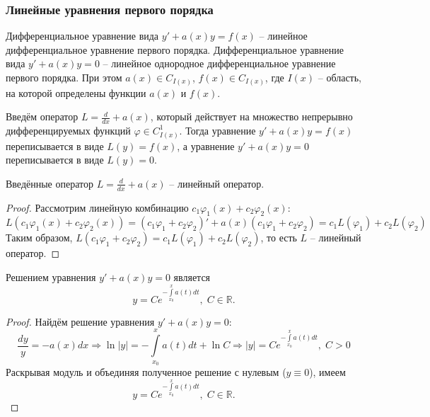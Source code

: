\subsubsection{Линейные уравнения первого порядка}

\begin{definition}
    Дифференциальное уравнение вида $y' + a(x) y = f(x)$ -- линейное дифференциальное уравнение первого порядка. Дифференциальное уравнение вида $y' + a(x) y = 0$ -- линейное однородное дифференциальное уравнение первого порядка. При этом $a(x) \in C_{I(x)}$, $f(x) \in C_{I(x)}$, где $I(x)$ -- область, на которой определены функции $a(x)$ и $f(x)$. 
\end{definition}

Введём оператор $L = \frac{d}{dx} + a(x)$, который действует на множество непрерывно дифференцируемых функций $\varphi \in C^1_{I(x)}$. Тогда уравнение $y' + a(x) y = f(x)$ переписывается в виде $L(y) = f(x)$, а уравнение $y' + a(x) y = 0$ переписывается в виде $L(y) = 0$.

\begin{theorem}
    Введённые оператор $L = \frac{d}{dx} + a(x)$ -- линейный оператор.
\end{theorem}

\begin{proof}
    Рассмотрим линейную комбинацию $c_1 \varphi_1(x) + c_2 \varphi_2(x)$:
    \begin{equation}
        L(c_1 \varphi_1(x) + c_2 \varphi_2(x)) = (c_1 \varphi_1 + c_2 \varphi_2)' + a(x) (c_1 \varphi_1 + c_2 \varphi_2) = c_1 L(\varphi_1) + c_2 L(\varphi_2)
    \end{equation}
    Таким образом, $L(c_1 \varphi_1 + c_2 \varphi_2) = c_1 L(\varphi_1) + c_2 L(\varphi_2)$, то есть $L$ -- линейный оператор.
\end{proof}

\begin{proposition}
    Решением уравнения $y' + a(x) y = 0$ является
    \begin{equation}
        y = C e^{-\int\limits_{x_0}^{x} a(t) dt}, \; C \in \mathbb{R}.
    \end{equation}
\end{proposition}

\begin{proof}
    Найдём решение уравнения $y' + a(x) y = 0$: 
    \begin{equation}
        \frac{dy}{y} = -a(x) dx \Rightarrow \ln |y| = - \int\limits_{x_0}^{x} a(t) dt + \ln C \Rightarrow |y| = C e^{-\int\limits_{x_0}^{x} a(t) dt}, \; C > 0
    \end{equation}
    Раскрывая модуль и объединяя полученное решение с нулевым ($y \equiv 0$), имеем
    \begin{equation}
        y = C e^{-\int\limits_{x_0}^{x} a(t) dt}, \; C \in \mathbb{R}.
    \end{equation}
\end{proof}

